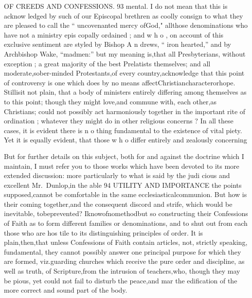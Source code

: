 \documentclass[
]{book}
\begin{document}
OF CREEDS AND CONFESSIONS. 93
mental. I do not mean that this is acknow
ledged by such of our Episcopal brethren as
coolly consign to what they are pleased to call
the `` uncovenanted mercy ofGod," allthose denominations who have not a ministry epis
copally ordained ; and w h o , on account of this
exclusive sentiment are styled by Bishop A n
drews, `` iron hearted,'' and by Archbishop
Wake, ``madmen:'' but my meaning is,that
all Presbyterians, without exception ; a great
majority of the best Prelatists themselves;
and all moderate,sober-minded Protestants,of
every country,acknowledge that this point of
controversy is one which does by no means affectChristiancharacterorhope. Stillisit
not plain, that a body of ministers entirely differing among themselves as to this point; though they might love,and commune with, each other,as Christians; could not possibly act harmoniously together in the important rite of ordination ; whatever they might do in other religious concerns ?
In all these cases, it is evident there is n o
thing fundamental to the existence of vital
piety. Yet it is equally evident, that those w h o differ entirely and zealously concerning

But for further details on this subject, both for and against the doctrine which I maintain, I must refer you to those works which have been devoted to its more extended discussion: more particularly to what is said by the judi cious and excellent Mr.~Dunlop,in the able
94 UTILITY AND IMPORTANCE
the points supposed,cannot be comfortable in the same ecclesiasticalcommunion. But how
is their coming together,and the consequent
discord and strife, which would be inevitable, tobeprevented? Iknowofnomethodbut so constructing their Confessions of Faith as to form different families or denominations, and to shut out from each those who are hos
tile to its distinguishing principles of order. It is plain,then,that unless Confessions of Faith contain articles, not, strictly speaking,
fundamental, they cannot possibly answer one principal purpose for which they are formed,
viz.guarding churches which receive the pure order and discipline, as well as truth, of Scripture,from the intrusion of teachers,who, though they may be pious, yet could not fail to disturb the peace,and mar the edification of the more correct and sound part of the body.
\end{document}
